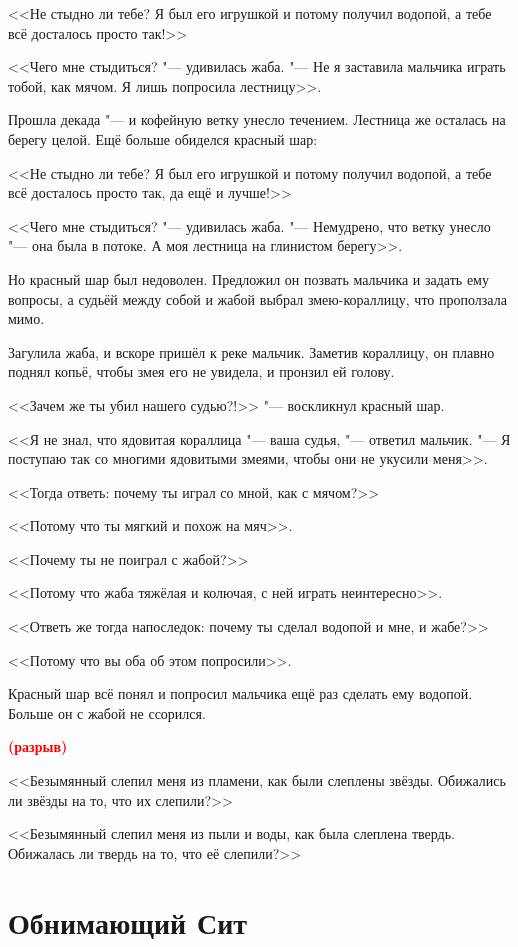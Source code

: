 \documentclass[a4paper,10pt]{book}
\newcommand{\spacing}{\textcolor{red}{\textbf{(разрыв)}}}
\begin{document}
<<Не стыдно ли тебе? Я был его игрушкой и потому получил водопой, а тебе всё 
досталось просто так!>>

<<Чего мне стыдиться? "--- удивилась жаба. "--- Не я заставила мальчика играть 
тобой, как мячом. Я лишь попросила лестницу>>.

Прошла декада "--- и кофейную ветку унесло течением. Лестница же осталась на 
берегу целой. Ещё больше обиделся красный шар:

<<Не стыдно ли тебе? Я был его игрушкой и потому получил водопой, а тебе всё 
досталось просто так, да ещё и лучше!>>

<<Чего мне стыдиться? "--- удивилась жаба. "--- Немудрено, что ветку унесло 
"--- 
она была в потоке. А моя лестница на глинистом берегу>>.

Но красный шар был недоволен. Предложил он позвать мальчика и задать ему 
вопросы,
а судьёй между собой и жабой выбрал змею-кораллицу, что проползала мимо.

Загулила жаба, и вскоре пришёл к реке мальчик. Заметив кораллицу, он плавно 
поднял копьё,
чтобы змея его не увидела, и пронзил ей голову.

<<Зачем же ты убил нашего судью?!>> "--- воскликнул красный шар.

<<Я не знал, что ядовитая кораллица "--- ваша судья, "--- ответил мальчик. "--- 
Я поступаю так
со многими ядовитыми змеями, чтобы они не укусили меня>>.

<<Тогда ответь: почему ты играл со мной, как с мячом?>>

<<Потому что ты мягкий и похож на мяч>>.

<<Почему ты не поиграл с жабой?>>

<<Потому что жаба тяжёлая и колючая, с ней играть неинтересно>>.

<<Ответь же тогда напоследок: почему ты сделал водопой и мне, и жабе?>>

<<Потому что вы оба об этом попросили>>.

Красный шар всё понял и попросил мальчика ещё раз сделать ему водопой. Больше 
он 
с жабой не ссорился.

\spacing

<<Безымянный слепил меня из пламени, как были слеплены звёзды. Обижались ли 
звёзды на то, что их слепили?>>

<<Безымянный слепил меня из пыли и воды, как была слеплена твердь. Обижалась ли 
твердь на то, что её слепили?>>

\section{Обнимающий Сит}
\end{document}
